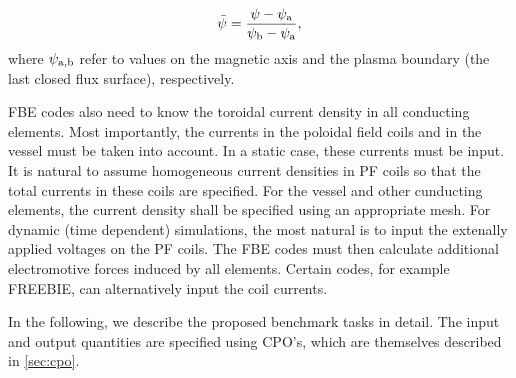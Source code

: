 \begin{equation}
\bar \psi  = \frac{{\psi  - {\psi _{\rm{a}}}}}{{{\psi _{\rm{b}}} - {\psi _{\rm{a}}}}},
\end{equation}
where $\psi _{\rm{a,b}}$ refer to values on the magnetic axis and the plasma boundary (the last closed flux surface), respectively.

FBE codes also need to know the toroidal current density in all conducting elements. Most importantly, the currents in the poloidal field coils and in the vessel must be taken into account. In a static case, these currents must be input. It is natural to assume homogeneous current densities in PF coils so that the total currents in these coils are specified. For the vessel and other cunducting elements, the current density shall be specified using an appropriate mesh. For dynamic (time dependent) simulations, the most natural is to input the extenally applied voltages on the PF coils. The FBE codes must then calculate additional electromotive forces induced by all elements. Certain codes, for example FREEBIE, can alternatively input the coil currents.

In the following, we describe the proposed benchmark tasks in detail. The input and output quantities are specified using CPO's, which are themselves described in \ref{sec:cpo}.
